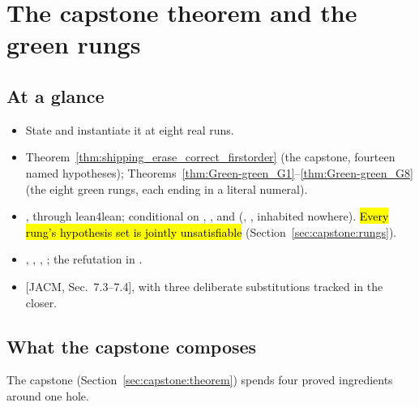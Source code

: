 \chapter{The capstone theorem and the green rungs}
\label{chap:capstone}

\section*{At a glance}
\begin{itemize}
\item {} State  and instantiate it at eight real  runs.
\item {} Theorem~\ref{thm:shipping_erase_correct_firstorder} (the capstone, fourteen named hypotheses); Theorems~\ref{thm:Green-green_G1}--\ref{thm:Green-green_G8} (the eight green rungs, each ending in a literal \lbox{} numeral).
\item {} \stProved{}, \stInherited{} through lean4lean; conditional on \stAssumed{}
, ,  and 
(, \stOpen{}, inhabited nowhere). \hl{Every rung's hypothesis set is jointly
unsatisfiable} (Section~\ref{sec:capstone:rungs}).
\item {} , , , ; the refutation in .
\item {} [JACM, Sec.~7.3--7.4], with three deliberate substitutions tracked in the closer.
\end{itemize}

\section{What the capstone composes}
\label{sec:capstone:overview}

The capstone (Section~\ref{sec:capstone:theorem}) spends four proved ingredients around one hole.

